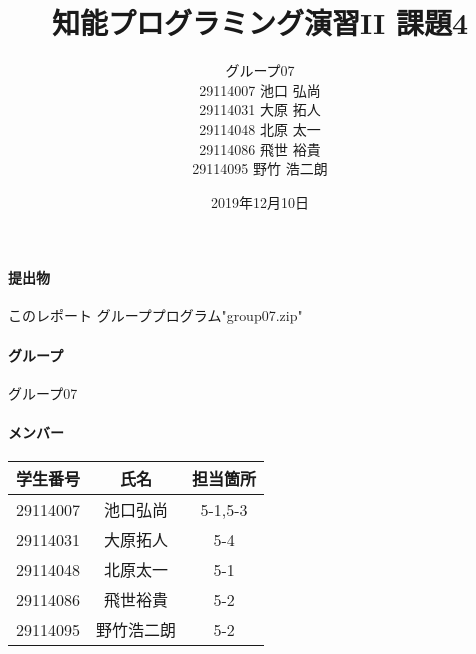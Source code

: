 \documentclass{jarticle}
\title{知能プログラミング演習II 課題4}
\author{グループ07\\
    29114007 池口 弘尚\\
    29114031 大原 拓人\\
    29114048 北原 太一\\
    29114086 飛世 裕貴\\
    29114095 野竹 浩二朗\\
}
\date{2019年12月10日}
\begin{document}
\maketitle

\paragraph{提出物} このレポート グループプログラム"group07.zip"
\paragraph{グループ} グループ07
\paragraph{メンバー}
\begin{tabular}{|c|c|c|}
    \hline
    学生番号&氏名&担当箇所\\
    \hline\hline
    29114007&池口弘尚&5-1,5-3\\
    \hline
    29114031&大原拓人&5-4\\
    \hline
    29114048&北原太一&5-1\\
    \hline
    29114086&飛世裕貴&5-2\\
    \hline
    29114095&野竹浩二朗&5-2\\
    \hline
\end{tabular}
\end{document}

